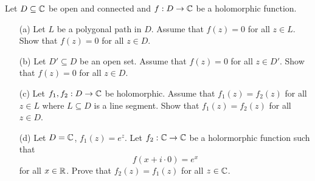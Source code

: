 \documentclass[a4paper]{article}
\begin{document}
\begin{problem}
   Let \( D \subseteq  \mathbb{C}  \) be open and connected and \( f: D \to \mathbb{C}  \) be a holomorphic function. 
   \begin{enumerate}
       \item[(a)] Let \( L  \) be a polygonal path in \( D  \). Assume that \( f(z) = 0  \) for all \( z \in L  \). Show that \( f(z) = 0  \) for all \( z \in D  \).
        \item[(b)] Let \( D' \subseteq D   \) be an open set. Assume that \( f(z) = 0  \) for all \( z \in D' \). Show that \( f(z)= 0 \) for all \( z \in D  \).
        \item[(c)] Let \( {f}_{1}, {f}_{2} : D \to \mathbb{C}  \) be holomorphic. Assume that \( {f}_{1}(z) = {f}_{2}(z) \) for all \( z \in L  \) where \( L \subseteq  D   \) is a line segment. Show that \( {f}_{1}(z) = {f}_{2}(z) \) for all \( z \in D  \).
        \item[(d)] Let \( D = \mathbb{C}  \), \( {f}_{1}(z) = e^{z} \). Let \( {f}_{2} : \mathbb{C} \to \mathbb{C}  \) be a holormorphic function such that 
            \[  f(x + i \cdot 0) = e^{x} \] 
            for all \( x \in \mathbb{R}  \). Prove that \( {f}_{2}(z) = {f}_{1}(z) \) for all \( z \in \mathbb{C}  \).
   \end{enumerate} 
\end{problem}
\end{document}
